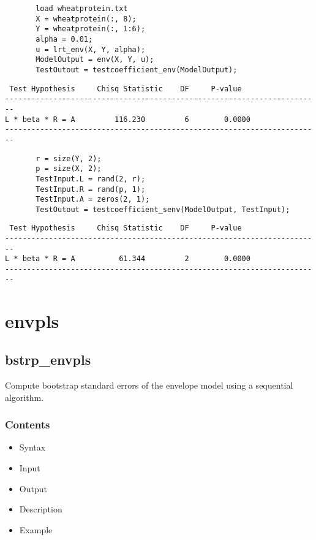\documentclass[a4paper,11pt,openany]{memoir}
\begin{document}
\begin{verbatim}       load wheatprotein.txt
       X = wheatprotein(:, 8);
       Y = wheatprotein(:, 1:6);
       alpha = 0.01;
       u = lrt_env(X, Y, alpha);
       ModelOutput = env(X, Y, u);
       TestOutout = testcoefficient_env(ModelOutput);
       \end{verbatim}
        \color{lightgray}\ttfamily \begin{verbatim}
 Test Hypothesis     Chisq Statistic    DF     P-value
------------------------------------------------------------------------
L * beta * R = A         116.230         6        0.0000
------------------------------------------------------------------------
\end{verbatim} \rmfamily
\color{black}       
\begin{verbatim}
       r = size(Y, 2);
       p = size(X, 2);
       TestInput.L = rand(2, r);
       TestInput.R = rand(p, 1);
       TestInput.A = zeros(2, 1);
       TestOutout = testcoefficient_senv(ModelOutput, TestInput);\end{verbatim}
    
        \color{lightgray}\ttfamily \begin{verbatim}
 Test Hypothesis     Chisq Statistic    DF     P-value
------------------------------------------------------------------------
L * beta * R = A          61.344         2        0.0000
------------------------------------------------------------------------
\end{verbatim} \rmfamily
\color{black}
    
\newpage
\chapter{envpls}
\rmfamily
\color{black}\section{bstrp\_envpls}

\begin{par}
Compute bootstrap standard errors of the envelope model using a sequential algorithm.
\end{par} \vspace{1em}

\subsection*{Contents}

\begin{itemize}
\setlength{\itemsep}{-1ex}
   \item Syntax
   \item Input
   \item Output
   \item Description
   \item Example
\end{itemize}
\end{document}
